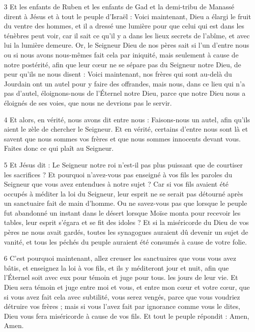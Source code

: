 \par 3 Et les enfants de Ruben et les enfants de Gad et la demi-tribu de Manassé dirent à Jésus et à tout le peuple d'Israël : Voici maintenant, Dieu a élargi le fruit du ventre des hommes, et il a dressé une lumière pour que celui qui est dans les ténèbres peut voir, car il sait ce qu'il y a dans les lieux secrets de l'abîme, et avec lui la lumière demeure. Or, le Seigneur Dieu de nos pères sait si l'un d'entre nous ou si nous avons nous-mêmes fait cela par iniquité, mais seulement à cause de notre postérité, afin que leur cœur ne se sépare pas du Seigneur notre Dieu, de peur qu'ils ne nous disent : Voici maintenant, nos frères qui sont au-delà du Jourdain ont un autel pour y faire des offrandes, mais nous, dans ce lieu qui n'a pas d'autel, éloignons-nous de l'Éternel notre Dieu, parce que notre Dieu nous a éloignés de ses voies, que nous ne devrions pas le servir.

\par 4 Et alors, en vérité, nous avons dit entre nous : Faisons-nous un autel, afin qu'ils aient le zèle de chercher le Seigneur. Et en vérité, certains d’entre nous sont là et savent que nous sommes vos frères et que nous sommes innocents devant vous. Faites donc ce qui plaît au Seigneur.

\par 5 Et Jésus dit : Le Seigneur notre roi n'est-il pas plus puissant que de courtiser les sacrifices ? Et pourquoi n'avez-vous pas enseigné à vos fils les paroles du Seigneur que vous avez entendues à notre sujet ? Car si vos fils avaient été occupés à méditer la loi du Seigneur, leur esprit ne se serait pas détourné après un sanctuaire fait de main d'homme. Ou ne savez-vous pas que lorsque le peuple fut abandonné un instant dans le désert lorsque Moïse monta pour recevoir les tables, leur esprit s'égara et se fit des idoles ? Et si la miséricorde du Dieu de vos pères ne nous avait gardés, toutes les synagogues auraient dû devenir un sujet de vanité, et tous les péchés du peuple auraient été consumés à cause de votre folie.

\par 6 C'est pourquoi maintenant, allez creuser les sanctuaires que vous vous avez bâtis, et enseignez la loi à vos fils, et ils y méditeront jour et nuit, afin que l'Éternel soit avec eux pour témoin et juge pour tous. les jours de leur vie. Et Dieu sera témoin et juge entre moi et vous, et entre mon cœur et votre cœur, que si vous avez fait cela avec subtilité, vous serez vengés, parce que vous voudriez détruire vos frères ; mais si vous l'avez fait par ignorance comme vous le dites, Dieu vous fera miséricorde à cause de vos fils. Et tout le peuple répondit : Amen, Amen.

